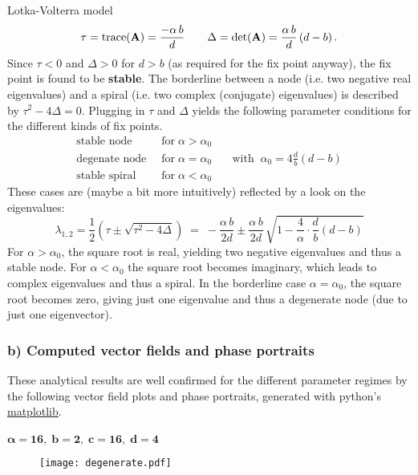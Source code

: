 \documentclass[11pt,headinclude,bibliography=totocnumbered,english,parskip=half-]{scrartcl}
\begin{document}
\begin{section}
\begin{subsection}{Lotka-Volterra model}
$$\tau=\text{trace}(\text{\textbf{A}}) = \frac{-\alpha\,b}{d} \qquad  \Delta=\text{det}(\text{\textbf{A}})= \frac{\alpha\,b}{d}\left(d-b\right). $$
Since $\tau < 0$ and $\Delta>0$ for $d>b$ (as required for the fix point anyway), the fix point is found to be \textbf{stable}. The borderline between a node (i.e. two negative real eigenvalues) and a spiral (i.e. two complex (conjugate) eigenvalues) is described by $\tau^2- 4\Delta=0$. Plugging in $\tau$ and $\Delta$ yields the following parameter conditions for the different kinds of fix points. 
\begin{align*}
 \text{stable node} & \;\;\text{for} \;\alpha > \alpha_0& \\
             \text{degenate node} & \;\;\text{for} \;\alpha = \alpha_0 &\quad \text{with} \;\; \alpha_0=4 \frac{d}{b}(d-b)\\
             \text{stable spiral} & \;\;\text{for} \;\alpha < \alpha_0&
\end{align*}
These cases are (maybe a bit more intuitively) reflected by a look on the eigenvalues:
$$
\lambda_{1,2}=\frac{1}{2}\left(\tau\pm \sqrt{\tau^2-4\Delta}\right) \;=\; - \frac{\alpha\,b}{2d}\pm\frac{\alpha\,b}{2d}\,\sqrt{1-\frac{4}{\alpha}\cdot\frac{d}{b}\left(d-b\right)}
$$
For $\alpha > \alpha_0$, the square root is real, yielding two negative eigenvalues and thus a stable node. For $\alpha < \alpha_0$ the square root becomes imaginary, which leads to complex eigenvalues and thus a spiral. In the borderline case $\alpha=\alpha_0$, the square root becomes zero, giving just one eigenvalue and thus a degenerate node (due to just one eigenvector). 
\newpage
\subsubsection*{b) Computed vector fields and phase portraits}
These analytical results are well confirmed for the different parameter regimes by the following vector field plots and phase portraits, generated with python's  \url{matplotlib}.
\\\\
\underline{$\mathbf{\alpha=16,\;b=2,\;c=16,\;d=4}$}
\begin{figure}
 \begin{center}
  \texttt{[image: degenerate.pdf]}
 \end{center}
\end{figure}



\end{subsection}
\end{section}
\end{document}
